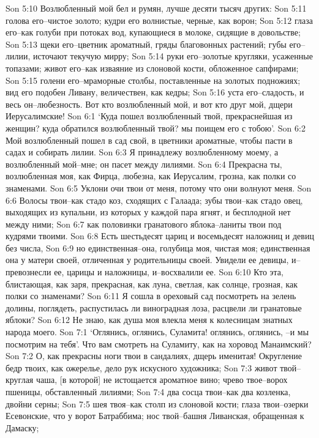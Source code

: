 Son 5:10  Возлюбленный мой бел и румян, лучше десяти тысяч других:
Son 5:11  голова его--чистое золото; кудри его волнистые, черные, как ворон;
Son 5:12  глаза его--как голуби при потоках вод, купающиеся в молоке, сидящие в довольстве;
Son 5:13  щеки его--цветник ароматный, гряды благовонных растений; губы его--лилии, источают текучую мирру;
Son 5:14  руки его--золотые кругляки, усаженные топазами; живот его--как изваяние из слоновой кости, обложенное сапфирами;
Son 5:15  голени его--мраморные столбы, поставленные на золотых подножиях; вид его подобен Ливану, величествен, как кедры;
Son 5:16  уста его--сладость, и весь он--любезность. Вот кто возлюбленный мой, и вот кто друг мой, дщери Иерусалимские!
Son 6:1  `Куда пошел возлюбленный твой, прекраснейшая из женщин? куда обратился возлюбленный твой? мы поищем его с тобою'.
Son 6:2  Мой возлюбленный пошел в сад свой, в цветники ароматные, чтобы пасти в садах и собирать лилии.
Son 6:3  Я принадлежу возлюбленному моему, а возлюбленный мой--мне; он пасет между лилиями.
Son 6:4  Прекрасна ты, возлюбленная моя, как Фирца, любезна, как Иерусалим, грозна, как полки со знаменами.
Son 6:5  Уклони очи твои от меня, потому что они волнуют меня.
Son 6:6  Волосы твои--как стадо коз, сходящих с Галаада; зубы твои--как стадо овец, выходящих из купальни, из которых у каждой пара ягнят, и бесплодной нет между ними;
Son 6:7  как половинки гранатового яблока--ланиты твои под кудрями твоими.
Son 6:8  Есть шестьдесят цариц и восемьдесят наложниц и девиц без числа,
Son 6:9  но единственная--она, голубица моя, чистая моя; единственная она у матери своей, отличенная у родительницы своей. Увидели ее девицы, и--превознесли ее, царицы и наложницы, и--восхвалили ее.
Son 6:10  Кто эта, блистающая, как заря, прекрасная, как луна, светлая, как солнце, грозная, как полки со знаменами?
Son 6:11  Я сошла в ореховый сад посмотреть на зелень долины, поглядеть, распустилась ли виноградная лоза, расцвели ли гранатовые яблоки?
Son 6:12  Не знаю, как душа моя влекла меня к колесницам знатных народа моего.
Son 7:1  `Оглянись, оглянись, Суламита! оглянись, оглянись, --и мы посмотрим на тебя'. Что вам смотреть на Суламиту, как на хоровод Манаимский?
Son 7:2  О, как прекрасны ноги твои в сандалиях, дщерь именитая! Округление бедр твоих, как ожерелье, дело рук искусного художника;
Son 7:3  живот твой--круглая чаша, [в которой] не истощается ароматное вино; чрево твое--ворох пшеницы, обставленный лилиями;
Son 7:4  два сосца твои--как два козленка, двойни серны;
Son 7:5  шея твоя--как столп из слоновой кости; глаза твои--озерки Есевонские, что у ворот Батраббима; нос твой--башня Ливанская, обращенная к Дамаску;

